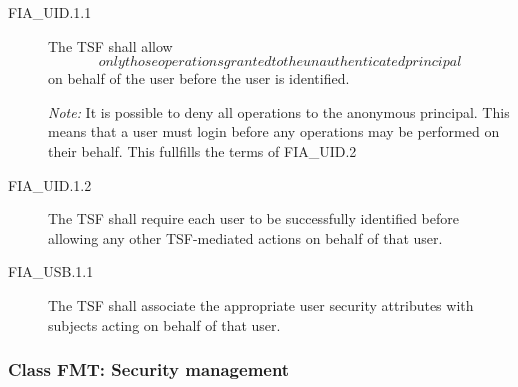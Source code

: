 \documentclass[12pt,english]{scrbook}
\begin{document}
\begin{description}
\item[FIA{\_}UID.1.1 ]

The TSF shall allow \emph{\[only those operations granted to the
unauthenticated principal\]} on behalf of the user before the user is
identified.

\emph{Note:} It is possible to deny all operations to the anonymous
principal. This means that a user must login before any operations may
be performed on their behalf. This fullfills the terms of FIA\_UID.2

\item[FIA{\_}UID.1.2 ]

The TSF shall require each user to be successfully
identified before allowing any other TSF-mediated actions on behalf
of that user.

\end{description}



\begin{description}
\item[FIA{\_}USB.1.1]

The TSF shall associate the appropriate user security
attributes with subjects acting on behalf of that user.

\end{description}





\subsubsection{Class FMT: Security management}


\end{document}
